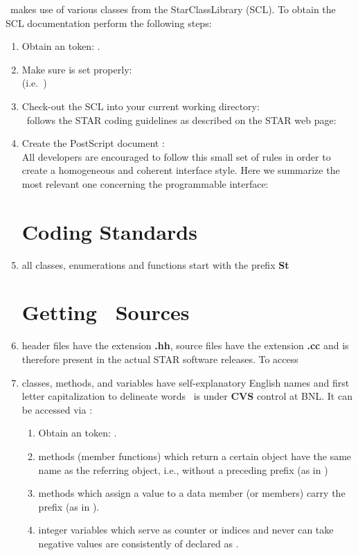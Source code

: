 \StEvent\ makes use of various classes from the StarClassLibrary (SCL).
To obtain the SCL documentation perform the following steps:
\begin{enumerate}
  \item Obtain an  token: .
  \item Make sure  is set properly:\\
    (i.e.~)
  \item Check-out the SCL into your current working directory:\\
\StEvent\ follows the STAR coding guidelines as described on the STAR web page: \\ 
  \item Create the PostScript document :\\
All developers are encouraged to follow this small set of rules 
in order to create a homogeneous and coherent interface style.
Here we summarize the most relevant one concerning the programmable interface:
\section{Coding Standards}  
\item all classes, enumerations and functions start with the prefix \textbf{St}
\section{Getting \StEvent\ Sources}  
\item header files have the extension \textbf{.hh},
    source files have the extension\textbf{ .cc}
and is therefore present in the actual STAR software releases. To access
\item classes, methods, and variables have self-explanatory English names
    and first letter capitalization to delineate words
\StEvent\ is under {\bf CVS} control at BNL.  It can
be accessed via :   
\begin{enumerate}
  \item Obtain an  token: .
\item methods (member functions) which return a certain object have the same name as the referring object, i.e.,
    without a preceding  prefix (as in )
\item methods which assign a value to a data member (or members) 
    carry the prefix  (as in  ).
\item integer variables which serve as counter or indices and never can take negative
    values are consistently of declared as . 

\end{enumerate}
\end{enumerate}
